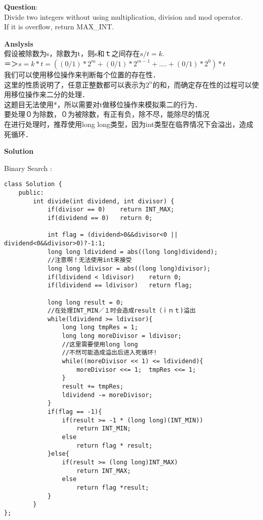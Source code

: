     
\begin{description}
    \item{\textbf{Question}}:\\%
		Divide two integers without using multiplication, division and mod operator.\\
		If it is overflow, return MAX\_INT.\\

    \item{\textbf{Anslysis}}\\
		假设被除数为s，除数为t，则s和ｔ之间存在$s/t=k$.\\
		＝＞$s = k \ast  t = ((0/1)\ast 2^{m} + (0/1)\ast2^{m-1} + .... + (0/1)\ast2^{0}) \ast t$\\
		我们可以使用移位操作来判断每个位置的存在性．\\
		这里的性质说明了，任意正整数都可以表示为$2 ^ n$的和，而确定存在性的过程可以使用移位操作来二分的处理．\\
		这题目无法使用*，所以需要对t做移位操作来模拟乘二的行为．\\
		要处理０为除数，０为被除数，有正有负，除不尽，能除尽的情况\\
		在进行处理时，推荐使用long long类型，因为int类型在临界情况下会溢出，造成死循环．\\

    \item{\textbf{Solution}}\\
	\item{Binary Search} : \\
		\begin{lstlisting}
class Solution {
	public:
		int divide(int dividend, int divisor) {
			if(divisor == 0)	return INT_MAX;
			if(dividend == 0)	return 0;

			int flag = (dividend>0&&divisor<0 || dividend<0&&divisor>0)?-1:1;
			long long ldividend = abs((long long)dividend);
			//注意啊！无法使用int来接受
			long long ldivisor = abs((long long)divisor);
			if(ldividend < ldivisor)	return 0;
			if(ldividend == ldivisor)	return flag;

			long long result = 0;
			//在处理INT_MIN／１时会造成result（ｉｎｔ)溢出
			while(ldividend >= ldivisor){
				long long tmpRes = 1;
				long long moreDivisor = ldivisor;
				//这里需要使用long long
				//不然可能造成溢出后进入死循环!
				while((moreDivisor << 1) <= ldividend){
					moreDivisor <<= 1;	tmpRes <<= 1;
				}
				result += tmpRes;
				ldividend -= moreDivisor;
			}
			if(flag == -1){
				if(result >= -1 * (long long)(INT_MIN))
					return INT_MIN;
				else
					return flag * result;
			}else{
				if(result >= (long long)INT_MAX)
					return INT_MAX;
				else
					return flag *result;
			}
		}
};
		\end{lstlisting}


\end{description}
